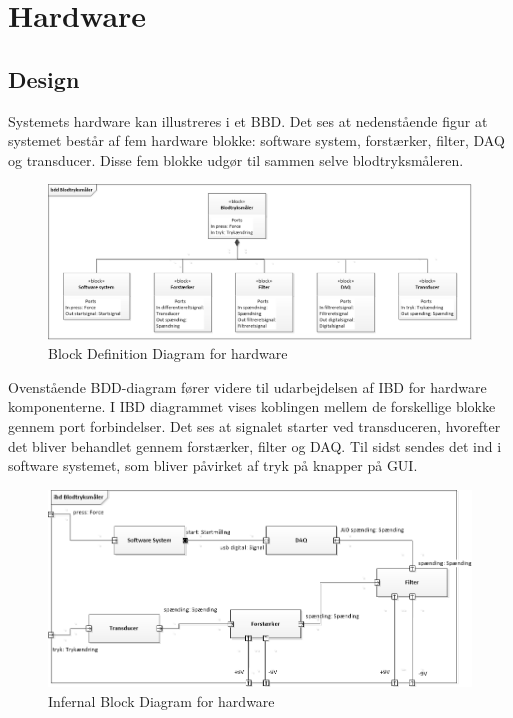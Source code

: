 \section{Hardware}
\subsection{Design}

Systemets hardware kan illustreres i et BBD. Det ses at nedenstående figur at systemet består af fem hardware blokke: software system, forstærker, filter, DAQ og transducer. Disse fem blokke udgør til sammen selve blodtryksmåleren.  
	
\begin{figure}[H]
	\centering
	\includegraphics[width=1.0\textwidth]{Figurer/BDD}
	\caption{Block Definition Diagram for hardware}
\end{figure}

Ovenstående BDD-diagram fører videre til udarbejdelsen af IBD for hardware komponenterne. I IBD diagrammet vises koblingen mellem de forskellige blokke gennem port forbindelser.  Det ses at signalet starter ved transduceren, hvorefter det bliver behandlet gennem forstærker, filter og DAQ. Til sidst sendes det ind i software systemet, som bliver påvirket af tryk på knapper på GUI. 

\begin{figure}[H]
	\centering
	\includegraphics[width=1.0\textwidth]{Figurer/IBD}
	\caption{Infernal Block Diagram for hardware}
	\label{fig:IBD viser koblingen mellem blodtrykssystemets hardwaredele}
\end{figure}

